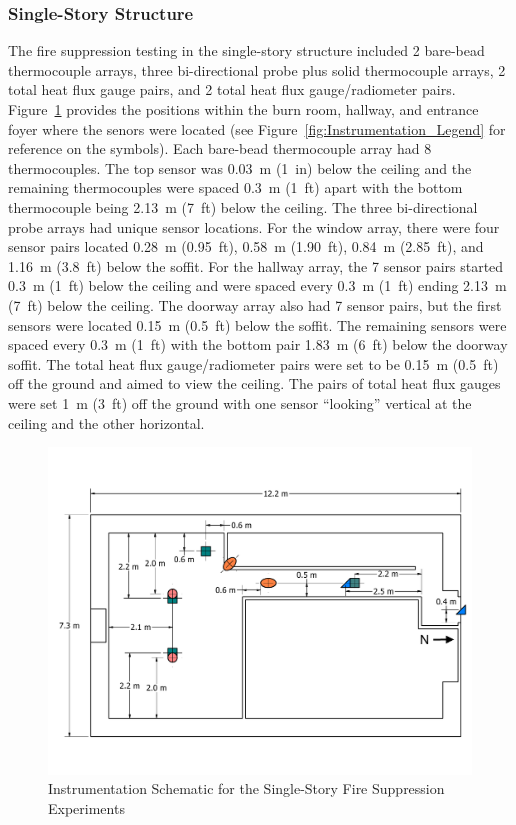 \documentclass[12pt,oneside]{book}
\begin{document}
\subsubsection*{Single-Story Structure}

The fire suppression testing in the single-story structure included 2 bare-bead thermocouple arrays, three bi-directional probe plus solid thermocouple arrays, 2 total heat flux gauge pairs, and 2 total heat flux gauge/radiometer pairs. Figure~\ref{fig:Fire_Suppression_Instrumentation_Dimensions} provides the positions within the burn room, hallway, and entrance foyer where the senors were located (see Figure~\ref{fig:Instrumentation_Legend} for reference on the symbols). Each bare-bead thermocouple array had 8 thermocouples. The top sensor was 0.03~m (1~in) below the ceiling and the remaining thermocouples were spaced 0.3~m (1~ft) apart with the bottom thermocouple being 2.13~m (7~ft) below the ceiling. The three bi-directional probe arrays had unique sensor locations. For the window array, there were four sensor pairs located 0.28~m (0.95~ft), 0.58~m (1.90~ft), 0.84~m (2.85~ft), and 1.16~m (3.8~ft) below the soffit. For the hallway array, the 7 sensor pairs started 0.3~m (1~ft) below the ceiling and were spaced every 0.3~m (1~ft) ending 2.13~m (7~ft) below the ceiling. The doorway array also had 7 sensor pairs, but the first sensors were located 0.15~m (0.5~ft) below the soffit. The remaining sensors were spaced every 0.3~m (1~ft) with the bottom pair 1.83~m (6~ft) below the doorway soffit. The total heat flux gauge/radiometer pairs were set to be 0.15~m (0.5~ft) off the ground and aimed to view the ceiling. The pairs of total heat flux gauges were set 1~m (3~ft) off the ground with one sensor ``looking'' vertical at the ceiling and the other horizontal.

\begin{figure}[!ht]
	\includegraphics[width=\columnwidth]{../Figures/Floor_Plans/PDFs/East_Structure/DelCo_2012_East_Structure_Instrumentation}
	\caption{Instrumentation Schematic for the Single-Story Fire Suppression Experiments}
	\label{fig:Fire_Suppression_Instrumentation_Dimensions}
\end{figure}
\end{document}
